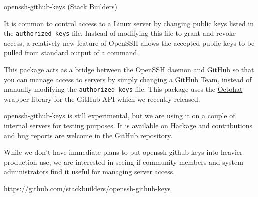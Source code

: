 \begin{hcarentry}[new]{openssh-github-keys (Stack Builders)}
\makeheader

It is common to control access to a Linux server by changing public
keys listed in the \texttt{authorized\_keys} file. Instead of
modifying this file to grant and revoke access, a relatively new
feature of OpenSSH allows the accepted public keys to be pulled from
standard output of a command.

This package acts as a bridge between the OpenSSH daemon and GitHub so
that you can manage access to servers by simply changing a GitHub
Team, instead of manually modifying the \texttt{authorized\_keys}
file. This package uses the
\href{http://hackage.haskell.org/package/octohat}{Octohat} wrapper
library for the GitHub API which we recently released.

openssh-github-keys is still experimental, but we are using it on a
couple of internal servers for testing purposes. It is available on
\href{http://hackage.haskell.org/package/openssh-github-keys}{Hackage}
and contributions and bug reports are welcome in the
\href{https://github.com/stackbuilders/openssh-github-keys}{GitHub
  repository}.

While we don't have immediate plans to put openssh-github-keys into
heavier production use, we are interested in seeing if community
members and system administrators find it useful for managing server
access.

\FurtherReading
  \url{https://github.com/stackbuilders/openssh-github-keys}
\end{hcarentry}
